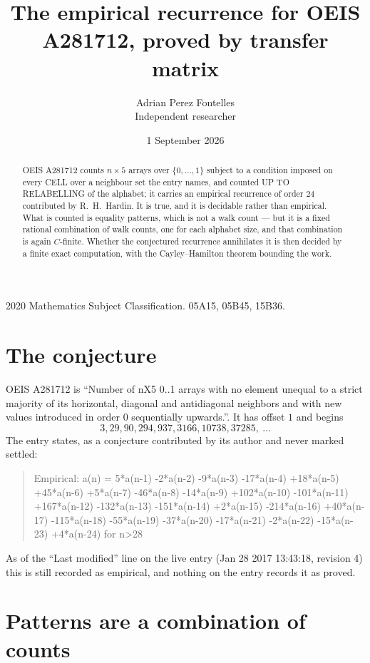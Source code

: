 \documentclass[11pt,a4paper]{article}
\title{The empirical recurrence for OEIS A281712, proved by transfer matrix}
\author{Adrian Perez Fontelles\\ \small Independent researcher}
\date{1 September 2026}
\theoremstyle{plain}
\theoremstyle{definition}
\begin{document}
\maketitle

\begin{abstract}
OEIS A281712 counts $n\times5$ arrays over $\{0,\dots,1\}$ subject to a condition imposed on
every CELL over a neighbour set the entry names, and counted UP TO RELABELLING of the
alphabet; it carries an empirical recurrence of order $24$ contributed by
R.~H.~Hardin. It is true, and it is decidable rather than empirical. What is counted is
equality patterns, which is not a walk count --- but it is a fixed rational combination of
walk counts, one for each alphabet size, and that combination is again $C$-finite. Whether the
conjectured recurrence annihilates it is then decided by a finite exact computation, with the
Cayley--Hamilton theorem bounding the work.
\end{abstract}

\noindent\small 2020 Mathematics Subject Classification. 05A15, 05B45, 15B36.\normalsize

\section{The conjecture}

OEIS A281712 is ``Number of nX5 0..1 arrays with no element unequal to a strict majority of its horizontal, diagonal and antidiagonal neighbors and with new values introduced in order 0 sequentially upwards.''. It has offset $1$ and begins
\[
3, 29, 90, 294, 937, 3166, 10738, 37285,\ \dots
\]
The entry states, as a conjecture contributed by its author and never marked settled:
\begin{quote}
Empirical: a(n) = 5*a(n-1) -2*a(n-2) -9*a(n-3) -17*a(n-4) +18*a(n-5) +45*a(n-6) +5*a(n-7) -46*a(n-8) -14*a(n-9) +102*a(n-10) -101*a(n-11) +167*a(n-12) -132*a(n-13) -151*a(n-14) +2*a(n-15) -214*a(n-16) +40*a(n-17) -115*a(n-18) -55*a(n-19) -37*a(n-20) -17*a(n-21) -2*a(n-22) -15*a(n-23) +4*a(n-24) for n>28
\end{quote}
As of the ``Last modified'' line on the live entry (Jan 28 2017 13:43:18, revision 4) this is still
recorded as empirical, and nothing on the entry records it as proved.

\section{Patterns are a combination of counts}
\end{document}
